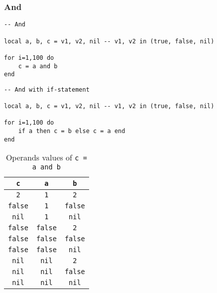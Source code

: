 \subsubsection{And}

\begin{mdframed}[style=LuaStyleFrame]
\begin{lstlisting}[style=LuaStyle]
-- And

local a, b, c = v1, v2, nil -- v1, v2 in (true, false, nil)

for i=1,100 do
 	c = a and b
end
\end{lstlisting}
\end{mdframed}

\begin{mdframed}[style=LuaStyleFrame]
\begin{lstlisting}[style=LuaStyle]
-- And with if-statement

local a, b, c = v1, v2, nil -- v1, v2 in (true, false, nil)

for i=1,100 do
 	if a then c = b else c = a end
end
\end{lstlisting}
\end{mdframed}

\begin{table}[H]
    \centering
    \begin{tabular}{|c|c|c|}
        \hline
        \texttt{c} & \texttt{a} & \texttt{b} \\
        \hline
        \texttt{  2  } & \texttt{  1  } & \texttt{  2  } \\
        \texttt{false} & \texttt{  1  } & \texttt{false} \\
        \texttt{ nil } & \texttt{  1  } & \texttt{ nil } \\
        \texttt{false} & \texttt{false} & \texttt{  2  } \\
        \texttt{false} & \texttt{false} & \texttt{false} \\
        \texttt{false} & \texttt{false} & \texttt{ nil } \\
        \texttt{ nil } & \texttt{ nil } & \texttt{  2  } \\
        \texttt{ nil } & \texttt{ nil } & \texttt{false} \\
        \texttt{ nil } & \texttt{ nil } & \texttt{ nil } \\
        \hline
    \end{tabular}
    \caption{Operands values of \texttt{c = a and b}}
    \label{tab:and-transformation}
\end{table}



